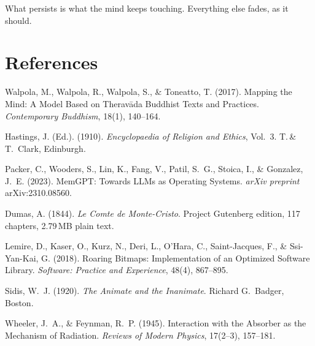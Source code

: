\documentclass[twocolumn,10pt]{article}
\begin{document}
What persists is what the mind keeps touching.  Everything else fades,
as it should.

\section*{References}

\begin{enumerate}[leftmargin=*,itemsep=2pt,label={[\arabic*]}]
\item Walpola, M., Walpola, R., Walpola, S., \& Toneatto, T. (2017).
  Mapping the Mind: A Model Based on Therav\=ada Buddhist Texts and
  Practices. \textit{Contemporary Buddhism}, 18(1), 140--164.

\item Hastings, J. (Ed.). (1910). \textit{Encyclopaedia of Religion
  and Ethics}, Vol.~3. T.\,\&\,T.~Clark, Edinburgh.

\item Packer, C., Wooders, S., Lin, K., Fang, V., Patil, S.~G.,
  Stoica, I., \& Gonzalez, J.~E. (2023). MemGPT: Towards LLMs as
  Operating Systems. \textit{arXiv preprint} arXiv:2310.08560.

\item Dumas, A. (1844). \textit{Le Comte de Monte-Cristo}. Project
  Gutenberg edition, 117 chapters, 2.79\,MB plain text.

\item Lemire, D., Kaser, O., Kurz, N., Deri, L., O'Hara, C.,
  Saint-Jacques, F., \& Ssi-Yan-Kai, G. (2018). Roaring Bitmaps:
  Implementation of an Optimized Software Library.
  \textit{Software: Practice and Experience}, 48(4), 867--895.

\item Sidis, W.~J. (1920). \textit{The Animate and the Inanimate}.
  Richard G.~Badger, Boston.

\item Wheeler, J.~A., \& Feynman, R.~P. (1945). Interaction with
  the Absorber as the Mechanism of Radiation.
  \textit{Reviews of Modern Physics}, 17(2--3), 157--181.
\end{enumerate}
\end{document}
